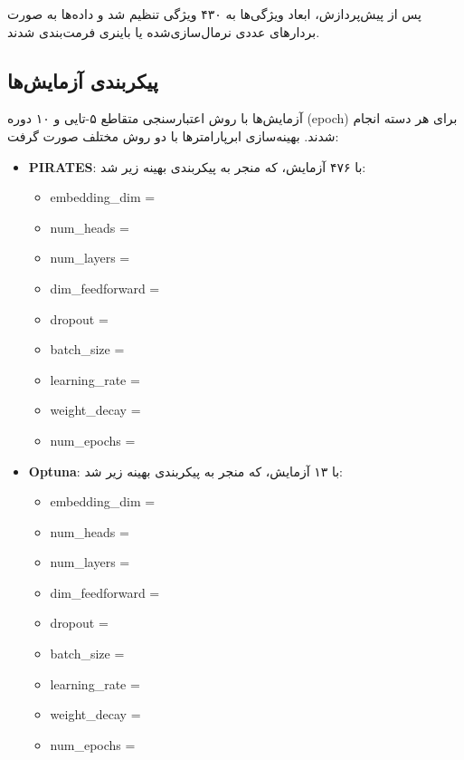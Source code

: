 پس از پیش‌پردازش، ابعاد ویژگی‌ها به ۴۳۰ ویژگی تنظیم شد و داده‌ها به صورت بردارهای عددی نرمال‌سازی‌شده یا باینری فرمت‌بندی شدند.

\subsection{پیکربندی آزمایش‌ها}
آزمایش‌ها با روش اعتبارسنجی متقاطع ۵-تایی و ۱۰ دوره (epoch) برای هر دسته انجام شدند. بهینه‌سازی ابرپارامترها با دو روش مختلف صورت گرفت:

\begin{itemize}
    \item \textbf{PIRATES}: با ۴۷۶ آزمایش، که منجر به پیکربندی بهینه زیر شد:
    \begin{itemize}
        \item embedding\_dim = 
        \item num\_heads = 
        \item num\_layers = 
        \item dim\_feedforward = 
        \item dropout = 
        \item batch\_size = 
        \item learning\_rate = 
        \item weight\_decay = 
        \item num\_epochs = 
    \end{itemize}
    
    \item \textbf{Optuna}: با ۱۳ آزمایش، که منجر به پیکربندی بهینه زیر شد:
    \begin{itemize}
        \item embedding\_dim = 
        \item num\_heads = 
        \item num\_layers = 
        \item dim\_feedforward = 
        \item dropout = 
        \item batch\_size = 
        \item learning\_rate = 
        \item weight\_decay = 
        \item num\_epochs = 
    \end{itemize}
\end{itemize}

